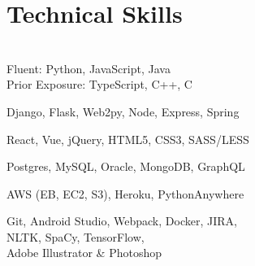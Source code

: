 \documentclass[]{hieudo-build}
\begin{document}
\begin{minipage}[t]{0.3\textwidth} 

\section{Technical Skills}
\begin{flushleft}
\narrower
{} 
\smallskip \\
\normalsize
  Fluent: Python, JavaScript, Java \\
  Prior Exposure: TypeScript, C++, C
\sectionsep

\normalsize
  Django, Flask, Web2py, Node, Express, Spring
\sectionsep

\normalsize
  React, Vue,
  jQuery, HTML5, CSS3, SASS/LESS
\sectionsep

\normalsize
  Postgres, MySQL, Oracle, MongoDB, GraphQL
\sectionsep

\normalsize
  AWS (EB, EC2, S3), Heroku, PythonAnywhere
\sectionsep

\normalsize
  Git, Android Studio, 
  Webpack, Docker, JIRA, \\
  NLTK, SpaCy, TensorFlow, \\
  Adobe Illustrator \& Photoshop
\end{flushleft}





\end{minipage}
\end{document}

